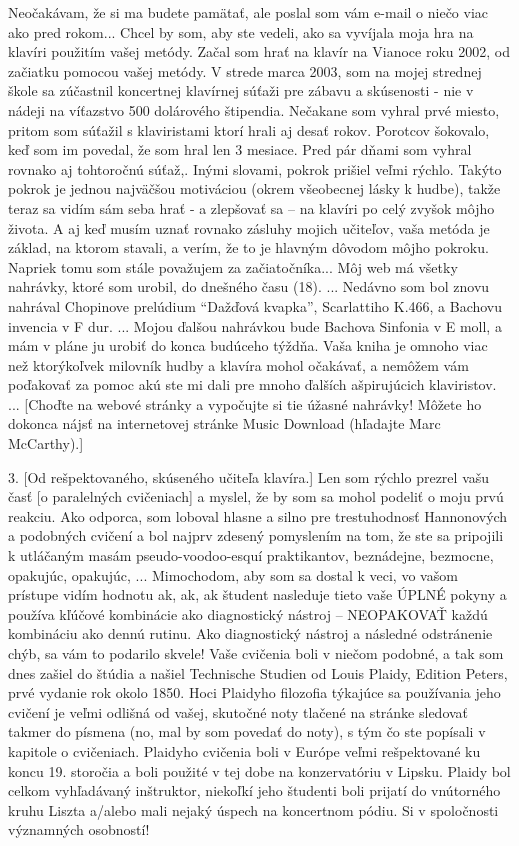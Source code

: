 Neočakávam, že si ma budete pamätať, ale poslal som vám e-mail o niečo viac ako pred rokom... Chcel by som, aby ste vedeli, ako sa vyvíjala moja hra na klavíri použitím vašej metódy. Začal som hrať na klavír na Vianoce roku 2002, od začiatku pomocou vašej metódy. V strede marca 2003, som na mojej strednej škole sa zúčastnil koncertnej klavírnej súťaži pre zábavu a skúsenosti - nie v nádeji na víťazstvo 500 dolárového štipendia. Nečakane som vyhral prvé miesto, pritom som súťažil s klaviristami ktorí hrali aj desať rokov. Porotcov šokovalo, keď som im povedal, že som hral len 3 mesiace. Pred pár dňami som vyhral rovnako aj tohtoročnú súťaž,. Inými slovami, pokrok prišiel veľmi rýchlo. Takýto pokrok je jednou najväčšou motiváciou (okrem všeobecnej lásky k hudbe), takže teraz sa vidím sám seba hrať - a zlepšovať sa – na klavíri po celý zvyšok môjho života. A aj keď musím uznať rovnako zásluhy mojich učiteľov, vaša metóda je základ, na ktorom stavali, a verím, že to je hlavným dôvodom môjho pokroku. Napriek tomu som stále považujem za začiatočníka... Môj web má všetky nahrávky, ktoré som urobil, do dnešného času (18). ... Nedávno som bol znovu nahrával Chopinove prelúdium “Dažďová kvapka”, Scarlattiho K.466, a Bachovu invencia v F dur. ... Mojou ďalšou nahrávkou bude Bachova Sinfonia v E moll, a mám v pláne ju urobiť do konca budúceho týždňa. Vaša kniha je omnoho viac než ktorýkoľvek milovník hudby a klavíra mohol očakávať, a nemôžem vám poďakovať za pomoc akú ste mi dali pre mnoho ďalších ašpirujúcich klaviristov. ... [Choďte na webové stránky a vypočujte si tie úžasné nahrávky! Môžete ho dokonca nájsť na internetovej stránke Music Download (hľadajte Marc McCarthy).] 
\medskip

3. [Od rešpektovaného, skúseného učiteľa klavíra.]
Len som rýchlo prezrel vašu časť [o paralelných cvičeniach] a myslel, že by som sa mohol podeliť o moju prvú reakciu. Ako odporca, som loboval hlasne a silno pre trestuhodnosť Hannonových a podobných cvičení a bol najprv zdesený pomyslením na tom, že ste sa pripojili k utláčaným masám pseudo-voodoo-esquí praktikantov, beznádejne, bezmocne, opakujúc, opakujúc, ... Mimochodom, aby som sa dostal k veci, vo vašom prístupe vidím hodnotu ak, ak, ak študent nasleduje tieto vaše ÚPLNÉ pokyny a používa kľúčové kombinácie ako diagnostický nástroj – NEOPAKOVAŤ každú kombináciu ako dennú rutinu. Ako diagnostický nástroj a následné odstránenie chýb, sa vám to podarilo skvele! Vaše cvičenia boli v niečom podobné, a tak som dnes zašiel do štúdia a našiel Technische Studien od Louis Plaidy, Edition Peters, prvé vydanie rok okolo 1850. Hoci Plaidyho filozofia týkajúce sa používania jeho cvičení je veľmi odlišná od vašej, skutočné noty tlačené na stránke sledovať takmer do písmena (no, mal by som povedať do noty), s tým čo ste popísali v kapitole o cvičeniach. Plaidyho cvičenia boli v Európe veľmi rešpektované ku koncu 19. storočia a boli použité v tej dobe na konzervatóriu v Lipsku. Plaidy bol celkom vyhľadávaný inštruktor, niekoľkí jeho študenti boli prijatí do vnútorného kruhu Liszta a/alebo mali nejaký úspech na koncertnom pódiu. Si v spoločnosti významných osobností! 
\medskip

